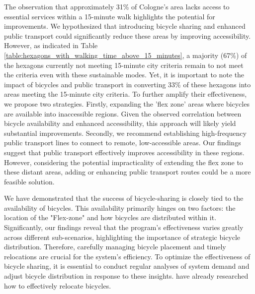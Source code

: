 The observation that approximately 31\% of Cologne's area lacks access to essential services within a 15-minute walk highlights the potential for improvements.
We hypothesized that introducing bicycle sharing and enhanced public transport could significantly reduce these areas by improving accessibility.
However, as indicated in Table \ref{table:hexagons_with_walking_time_above_15_minutes}, a majority (67\%) of the hexagons currently not meeting 15-minute city criteria remain to not meet the criteria even with these sustainable modes.
Yet, it is important to note the impact of bicycles and public transport in converting 33\% of these hexagons into areas meeting the 15-minute city criteria.
To further amplify their effectiveness, we propose two strategies.
Firstly, expanding the 'flex zone' areas where bicycles are available into inaccessible regions. 
Given the observed correlation between bicycle availability and enhanced accessibility, this approach will likely yield substantial improvements.
Secondly, we recommend establishing high-frequency public transport lines to connect to remote, low-accessible areas. 
Our findings suggest that public transport effectively improves accessibility in these regions. 
However, considering the potential impracticality of extending the flex zone to these distant areas, adding or enhancing public transport routes could be a more feasible solution.

We have demonstrated that the success of bicycle-sharing is closely tied to the availability of bicycles.
This availability primarily hinges on two factors: the location of the "Flex-zone" and how bicycles are distributed within it.
Significantly, our findings reveal that the program's effectiveness varies greatly across different sub-scenarios, highlighting the importance of strategic bicycle distribution.
Therefore, carefully managing bicycle placement and timely relocations are crucial for the system's efficiency.
To optimize the effectiveness of bicycle sharing, it is essential to conduct regular analyses of system demand and adjust bicycle distribution in response to these insights.
 have already researched how to effectively relocate bicycles.



